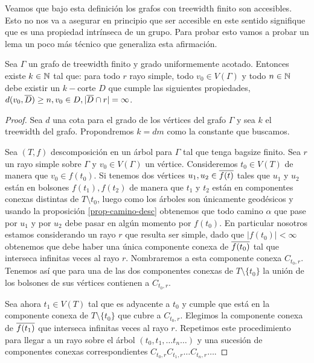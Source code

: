 \documentclass[tesis.tex]{subfiles}
\begin{document}
Veamos que bajo esta definición los grafos con treewidth finito son accesibles.
Esto no nos va a asegurar en principio que ser accesible en este sentido signifique que es una propiedad intrínseca de un grupo.
Para probar esto vamos a probar un lema un poco más técnico que generaliza esta afirmación.

\begin{lema}\label{lema_corte_treewidth}
	Sea $\Gamma$ un grafo de treewidth finito y grado uniformemente acotado.
	Entonces existe $k \in \mathbb{N}$ tal que:
	para todo $r$ rayo simple, todo $v_0 \in V(\Gamma)$ y todo $n \in \mathbb{N}$ debe existir un $k-$corte $D$ que cumple las siguientes propiedades, $d(v_0,\overline D) \ge n, v_0 \in D, |\overline D \cap r| = \infty$. 
\end{lema}

\begin{proof}
	Sea $d$ una cota para el grado de los vértices del grafo $\Gamma$ y sea $k$ el treewidth del grafo.
	Propondremos $k = dm$ como la constante que buscamos.
	
	Sea $(T,f)$ descomposición en un árbol para $\Gamma$ tal que tenga bagsize finito.
	Sea $r$ un rayo simple sobre $\Gamma$ y $v_{0} \in V(\Gamma)$ un vértice.
	Consideremos $t_0 \in V(T)$ de manera que $v_0 \in f(t_{0})$.
	Si tenemos dos vértices $u_1,u_2 \in \overline{ f(t)}$ tales que $u_1$ y $u_2$ están en bolsones $f(t_{1}), f(t_{2})$ de manera que $t_1$ y $t_2$ están en componentes conexas distintas de $T \setminus t_0$, luego como los árboles son únicamente geodésicos y usando la proposición \ref{prop-camino-desc} obtenemos que todo camino $\alpha$ que pase por $u_1$ y por $u_2$ debe pasar en algún momento por $f(t_{0})$.
	En particular nosotros estamos considerando un rayo $r$ que resulta ser simple, dado que  $|f({t_0})| < \infty$ obtenemos que debe haber una única componente conexa de $\overline{f({t_0})}$ tal que interseca infinitas veces al rayo $r$.
	Nombraremos a esta componente conexa $C_{t_0,r}$.
	Tenemos así que para una de las dos componentes conexas de $T \setminus \{t_{0}\}$ la unión de los bolsones de sus vértices contienen a $C_{t_{0},r}$.
	
	Sea ahora $t_{1} \in V(T)$ tal que es adyacente a $t_{0}$ y cumple que está en la componente conexa de $T \setminus \{t_{0}\}$ que cubre a $C_{t_{0},r}$.  
	Elegimos la componente conexa de $\overline{f(t_{1})}$ que interseca infinitas veces al rayo $r$.
	Repetimos este procedimiento para llegar a un rayo sobre el árbol
	$(t_0,t_1, \dots t_n \dots)$ y una sucesión de componentes conexas correspondientes $C_{t_0,r} C_{t_1,r} \dots C_{t_n, r} \dots$.
	

\end{proof}
\end{document}
